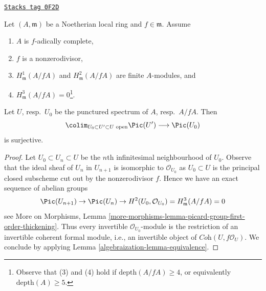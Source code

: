 \begin{lemma}
\label{algebraization-lemma-surjective-Pic-first}
\href{https://stacks.math.columbia.edu/tag/0F2D}{\texttt{Stacks tag 0F2D}}

Let $(A, \mathfrak m)$ be a Noetherian local ring and $f \in \mathfrak m$.
Assume
\begin{enumerate}
\item $A$ is $f$-adically complete,
\item $f$ is a nonzerodivisor,
\item $H^1_\mathfrak m(A/fA)$ and $H^2_\mathfrak m(A/fA)$
are finite $A$-modules, and
\item $H^3_\mathfrak m(A/fA) = 0$\footnote{Observe that (3) and (4) hold
if $\text{depth}(A/fA) \geq 4$, or equivalently $\text{depth}(A) \geq 5$.}.
\end{enumerate}
Let $U$, resp.\ $U_0$ be the punctured spectrum of $A$, resp.\ $A/fA$.
Then
$$
\colim_{U_0 \subset U' \subset U\text{ open}} \Pic(U')
\longrightarrow
\Pic(U_0)
$$
is surjective.
\end{lemma}

\begin{proof}

Let $U_0 \subset U_n \subset U$ be the $n$th infinitesimal neighbourhood
of $U_0$. Observe that the ideal sheaf of $U_n$ in $U_{n + 1}$ is
isomorphic to $\mathcal{O}_{U_0}$ as $U_0 \subset U$ is the principal
closed subscheme cut out by the nonzerodivisor $f$. Hence we have
an exact sequence of abelian groups
$$
\Pic(U_{n + 1}) \to \Pic(U_n) \to
H^2(U_0, \mathcal{O}_{U_0}) = H^3_\mathfrak m(A/fA) = 0
$$
see More on Morphisms, Lemma
\ref{more-morphisms-lemma-picard-group-first-order-thickening}.
Thus every invertible $\mathcal{O}_{U_0}$-module is the restriction
of an invertible coherent formal module, i.e., an invertible object of
$\textit{Coh}(U, f\mathcal{O}_U)$. We conclude by applying
Lemma \ref{algebraization-lemma-equivalence}.
\end{proof}

